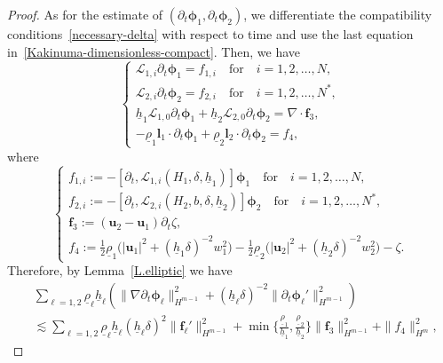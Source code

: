 \documentclass[11pt,leqno]{article}
\numberwithin{equation}{section}
\numberwithin{figure}{section}
\begin{document}
\begin{proof}
As for the estimate of $(\partial_t\bm{\phi}_1,\partial_t\bm{\phi}_2)$, we differentiate the compatibility 
conditions~\eqref{necessary-delta} with respect to time and use the last equation in~\eqref{Kakinuma-dimensionless-compact}. 
Then, we have 
%
\begin{equation}\label{equationdtphi}
\begin{cases}
 \mathcal{L}_{1,i} \partial_t\bm{\phi}_1 = f_{1,i} \quad\mbox{for}\quad i=1,2,\ldots,N, \\
 \mathcal{L}_{2,i} \partial_t\bm{\phi}_2 = f_{2,i} \quad\mbox{for}\quad i=1,2,\ldots,N^*, \\
 \underline{h}_1\mathcal{L}_{1,0} \partial_t\bm{\phi}_1
  + \underline{h}_2\mathcal{L}_{2,0} \partial_t\bm{\phi}_2 = \nabla\cdot\bm{f}_3, \\
 - \underline{\rho}_1\bm{l}_1 \cdot \partial_t\bm{\phi}_1
  + \underline{\rho}_2\bm{l}_2 \cdot \partial_t\bm{\phi}_2 = f_4,
\end{cases}
\end{equation}
%
where 
%
\begin{equation}\label{commutator-dt}
\begin{cases}
 f_{1,i} := -[\partial_t, \mathcal{L}_{1,i}(H_{1},\delta,\underline{h}_1)]\bm{\phi}_{1}
  \quad\mbox{for}\quad i=1,2,\ldots,N, \\ 
 f_{2,i} := -[\partial_t, \mathcal{L}_{2,i}(H_{2},b,\delta,\underline{h}_2)]\bm{\phi}_{2}
  \quad\mbox{for}\quad i=1,2,\ldots,N^*, \\ 
 \bm{f}_{3} := (\bm{u}_2-\bm{u}_1)\partial_t\zeta , \\
 f_{4} := \frac12\underline{\rho}_1\bigl( |{\bm u}_1|^2 + (\underline{h}_1\delta)^{-2} w_1^2 \bigr)
  - \frac12\underline{\rho}_2\bigl( |{\bm u}_2|^2 + (\underline{h}_2\delta)^{-2} w_2^2 \bigr)
  - \zeta.
\end{cases}
\end{equation}
%
Therefore, by Lemma~\ref{L.elliptic} we have 
%
\begin{align}\label{estimate-dt}
&\sum_{\ell=1,2}\underline{\rho}_\ell\underline{h}_\ell
 ( \|\nabla\partial_t\bm{\phi}_\ell\|_{H^{m-1}}^2
   + (\underline{h}_\ell\delta)^{-2}\|\partial_t\bm{\phi}_\ell'\|_{H^{m-1}}^2 ) \\
&\lesssim
 \sum_{\ell=1,2}\underline{\rho}_\ell\underline{h}_\ell
  (\underline{h}_\ell\delta)^2\|\bm{f}_\ell'\|_{H^{m-1}}^2
 +  \min\biggl\{\frac{\underline{\rho}_1}{\underline{h}_1},\frac{\underline{\rho}_2}{\underline{h}_2} \biggr\}
  \|\bm{f}_3\|_{H^{m-1}}^2
 + \|f_4\|_{H^m}^2, \nonumber

\end{align}
\end{proof}
\end{document}
